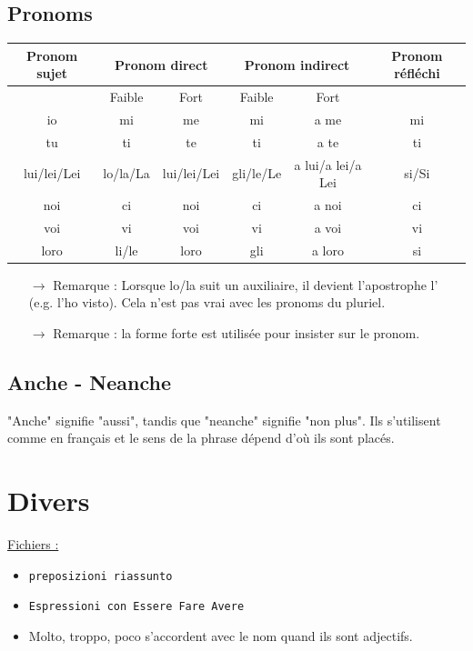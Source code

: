 \documentclass[12pt, openany]{report}
\begin{document}
\section{Pronoms}
\begin{center}
    \begin{tabular}{c|c|c|c|c|c}
        Pronom sujet & \multicolumn{2}{c|}{Pronom direct} & \multicolumn{2}{c|}{Pronom indirect} & Pronom réfléchi \\ \hline 
        & Faible & Fort & Faible & Fort & \\ \hline 
        io & mi & me & mi & a me & mi\\
        tu & ti & te & ti & a te & ti\\
        lui/lei/Lei & lo/la/La & lui/lei/Lei & gli/le/Le & a lui/a lei/a Lei & si/Si\\
        noi & ci & noi & ci & a noi & ci\\
        voi & vi & voi & vi & a voi & vi\\
        loro & li/le & loro & gli & a loro & si\\
    \end{tabular}
\end{center}
\begin{itemize}
    \item [$\to$] Remarque : Lorsque lo/la suit un auxiliaire, il devient l'apostrophe l' (e.g. l'ho visto). Cela n'est pas vrai avec les pronoms du pluriel.
    \item [$\to$] Remarque : la forme forte est utilisée pour insister sur le pronom.
\end{itemize}
\section{Anche - Neanche}
"Anche" signifie "aussi", tandis que "neanche" signifie "non plus". Ils s'utilisent comme en français et le sens de la phrase dépend d'où ils sont placés. 
\chapter{Divers}
\underline{Fichiers :}
\begin{itemize}
    \item \texttt{preposizioni riassunto}
    \item \texttt{Espressioni con Essere Fare Avere}
    \item Molto, troppo, poco s'accordent avec le nom quand ils sont adjectifs. 
\end{itemize}
\end{document}

